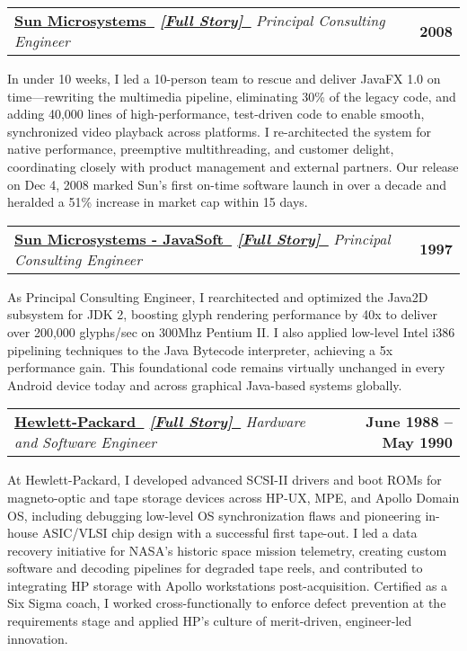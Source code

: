 \documentclass[letterpaper,11pt]{article}
\makeatletter
\newcommand{\resumeItem}[1]{
  \item\small{
    {#1 \vspace{-2pt}}
  }
}
\newcommand{\resumeSubheading}[4]{
  \vspace{-2pt}\item
    \begin{tabular*}{1.0\textwidth}[t]{l@{\extracolsep{\fill}}r}
      \textbf{#1}  \textit{\small#3} & \textbf{\small #2} \\
    \end{tabular*}\vspace{-7pt}
}
\makeatother
\begin{document}
\resumeSubheading
    {\href{https://www.oracle.com/sun}{Sun Microsystems~\faExternalLink}
    \quad\small
    \textit{
        \href{https://paul-charlton.vercel.app/story/4}{[Full Story]~{\fontspec{Symbola}\symbol{"1F517}}}}
    }
    {2008}
    {Principal Consulting Engineer}
    {Santa Clara, CA}
\resumeItem{
    In under 10 weeks, I led a 10-person team to rescue and deliver JavaFX 1.0 on time—rewriting the multimedia pipeline, eliminating 30\% of the legacy code, and adding 40,000 lines of high-performance, test-driven code to enable smooth, synchronized video playback across platforms. I re-architected the system for native performance, preemptive multithreading, and customer delight, coordinating closely with product management and external partners. Our release on Dec 4, 2008 marked Sun’s first on-time software launch in over a decade and heralded a 51\% increase in market cap within 15 days.
}
\newpage
\resumeSubheading
    {\href{https://www.oracle.com/sun}{Sun Microsystems - JavaSoft~\faExternalLink}
    \quad\small
    \textit{
        \href{https://paul-charlton.vercel.app/story/5}{[Full Story]~{\fontspec{Symbola}\symbol{"1F517}}}}
    }
    {1997}
    {Principal Consulting Engineer}
    {Palo Alto, CA}
\resumeItem{
    As Principal Consulting Engineer, I rearchitected and optimized the Java2D subsystem for JDK 2, boosting glyph rendering performance by 40x to deliver over 200,000 glyphs/sec on 300Mhz Pentium II. I also applied low-level Intel i386 pipelining techniques to the Java Bytecode interpreter, achieving a 5x performance gain. This foundational code remains virtually unchanged in every Android device today and across graphical Java-based systems globally.
}

\resumeSubheading
    {\href{https://www.hp.com}{Hewlett-Packard~\faExternalLink}
    \quad\small
    \textit{
        \href{https://paul-charlton.vercel.app/story/38}{[Full Story]~{\fontspec{Symbola}\symbol{"1F517}}}}
    }
    {June 1988 -- May 1990}
    {Hardware and Software Engineer}
    {Greeley, CO}
\resumeItem{
    At Hewlett-Packard, I developed advanced SCSI-II drivers and boot ROMs for magneto-optic and tape storage devices across HP-UX, MPE, and Apollo Domain OS, including debugging low-level OS synchronization flaws and pioneering in-house ASIC/VLSI chip design with a successful first tape-out. I led a data recovery initiative for NASA's historic space mission telemetry, creating custom software and decoding pipelines for degraded tape reels, and contributed to integrating HP storage with Apollo workstations post-acquisition. Certified as a Six Sigma coach, I worked cross-functionally to enforce defect prevention at the requirements stage and applied HP's culture of merit-driven, engineer-led innovation.
}
\end{document}
